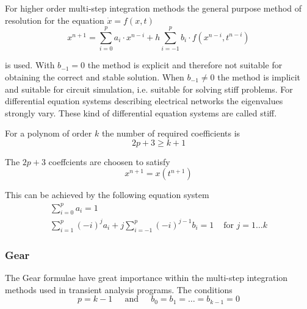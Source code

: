 \documentclass[10pt]{report}
\begin{document}
For higher order multi-step integration methods the general purpose
method of resolution for the equation $\dot{x} = f(x,t)$
\begin{equation}
x^{n+1} = \sum^p_{i=0} a_i\cdot x^{n-i} + h \sum^p_{i=-1} b_i\cdot f(x^{n-i}, t^{n-i})
\end{equation}

is used.  With $b_{-1} = 0$ the method is explicit and therefore not
suitable for obtaining the correct and stable solution.  When $b_{-1}
\ne 0$ the method is implicit and suitable for circuit simulation,
i.e. suitable for solving stiff problems.  For differential equation
systems describing electrical networks the eigenvalues strongly vary.
These kind of differential equation systems are called stiff.

\addvspace{12pt}

For a polynom of order $k$ the number of required coefficients is
\begin{equation}
2p + 3 \ge k + 1
\end{equation}

The $2p +3$ coeffcients are choosen to satisfy
\begin{equation}
x^{n+1} = x(t^{n+1})
\end{equation}

This can be achieved by the following equation system
\begin{align}
\sum^p_{i=0} a_i = 1\\
\sum^p_{i=1} (-i)^j a_i + j \sum^p_{i=-1} (-i)^{j-1} b_i = 1 & \textrm{ for } j = 1\ldots k
\end{align}

\subsubsection{Gear}

The Gear formulae have great importance within the multi-step
integration methods used in transient analysis programs.  The conditions
\begin{equation}
p = k - 1
\;\;\;\; \textrm{ and } \;\;\;\;
b_0 = b_1 = \ldots = b_{k-1} = 0
\end{equation}
\end{document}

